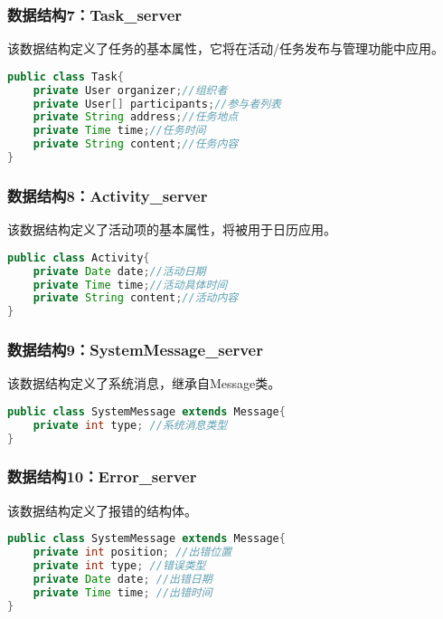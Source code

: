 \subsubsection{数据结构7：Task\_server}
该数据结构定义了任务的基本属性，它将在活动/任务发布与管理功能中应用。
\begin{lstlisting}[language=Java, caption=Task定义]
public class Task{
    private User organizer;//组织者
    private User[] participants;//参与者列表
    private String address;//任务地点
    private Time time;//任务时间
    private String content;//任务内容
}
\end{lstlisting}

\subsubsection{数据结构8：Activity\_server}
该数据结构定义了活动项的基本属性，将被用于日历应用。
\begin{lstlisting}[language=Java, caption=Activity定义]
public class Activity{
    private Date date;//活动日期
    private Time time;//活动具体时间
    private String content;//活动内容
}
\end{lstlisting}

\subsubsection{数据结构9：SystemMessage\_server}
该数据结构定义了系统消息，继承自Message类。
\begin{lstlisting}[language=Java, caption=SystemMessage定义]
public class SystemMessage extends Message{
    private int type; //系统消息类型
}
\end{lstlisting}

\subsubsection{数据结构10：Error\_server}
该数据结构定义了报错的结构体。
\begin{lstlisting}[language=Java, caption=Error定义]
public class SystemMessage extends Message{
    private int position; //出错位置
    private int type; //错误类型
    private Date date; //出错日期
    private Time time; //出错时间
}
\end{lstlisting}



